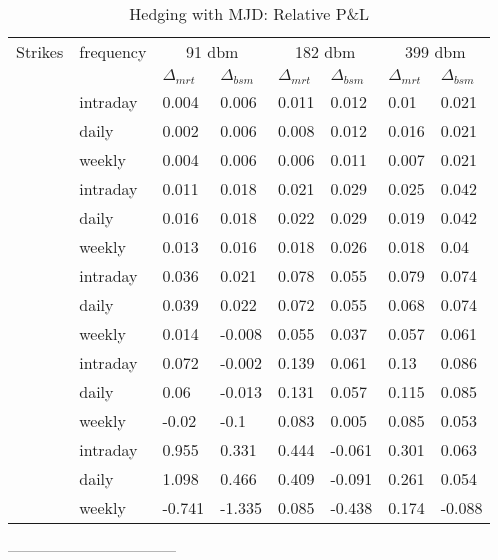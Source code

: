 \documentclass[12pt]{report}
\begin{document}
\begin{table}[ht]
\centering
\begin{tabular}{llllllll}
  \hline
  \hline
 Strikes & frequency  &\multicolumn{2}{c}{91 dbm} & \multicolumn{2}{c}{182 dbm} & \multicolumn{2}{c}{399 dbm} \\ 
   &  & $\Delta_{mrt}$ & $\Delta_{bsm}$ & $\Delta_{mrt}$ & $\Delta_{bsm}$ & $\Delta_{mrt}$ & $\Delta_{bsm}$ \\ 
   \hdashline
  \multirow{3}{*}{140} & intraday & 0.004 & 0.006 & 0.011 & 0.012 & 0.01 & 0.021 \\ 
  & daily & 0.002 & 0.006 & 0.008 & 0.012 & 0.016 & 0.021 \\ 
  & weekly & 0.004 & 0.006 & 0.006 & 0.011 & 0.007 & 0.021 \\ 
   \hdashline
  \multirow{3}{*}{160} & intraday & 0.011 & 0.018 & 0.021 & 0.029 & 0.025 & 0.042 \\ 
  & daily & 0.016 & 0.018 & 0.022 & 0.029 & 0.019 & 0.042 \\ 
  & weekly & 0.013 & 0.016 & 0.018 & 0.026 & 0.018 & 0.04 \\ 
   \hdashline
  \multirow{3}{*}{186} & intraday & 0.036 & 0.021 & 0.078 & 0.055 & 0.079 & 0.074 \\ 
  & daily & 0.039 & 0.022 & 0.072 & 0.055 & 0.068 & 0.074 \\ 
  & weekly & 0.014 & -0.008 & 0.055 & 0.037 & 0.057 & 0.061 \\ 
   \hdashline
  \multirow{3}{*}{200} & intraday & 0.072 & -0.002 & 0.139 & 0.061 & 0.13 & 0.086 \\ 
  & daily & 0.06 & -0.013 & 0.131 & 0.057 & 0.115 & 0.085 \\ 
  & weekly & -0.02 & -0.1 & 0.083 & 0.005 & 0.085 & 0.053 \\ 
   \hdashline
  \multirow{3}{*}{230} & intraday & 0.955 & 0.331 & 0.444 & -0.061 & 0.301 & 0.063 \\ 
  & daily & 1.098 & 0.466 & 0.409 & -0.091 & 0.261 & 0.054 \\ 
  & weekly & -0.741 & -1.335 & 0.085 & -0.438 & 0.174 & -0.088 \\ 
   \hline
\end{tabular}
\caption{Hedging with MJD: Relative P\&L} 
\label{t:analysis:merton:pl}
\end{table}




------------------------------------
\end{document}
